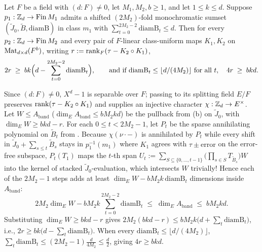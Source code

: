 \begin{theorem}\label{thm:sumset-rank}
Let $F$ be a field with $(d : F) \ne 0$, let $M_1, M_2, b \ge 1$, and let $1 \le k \le d$. Suppose
$p_1 : \mathbb{Z}_d \to \mathrm{Fin}\,M_1$ admits a shifted $(2M_2)$-fold monochromatic sumset
$(\widetilde{J}_0, \widetilde{B}, \mathrm{diamB})$ in class $m_1$ with
$\sum_{t=0}^{2M_2 - 2} \mathrm{diamB}_t \le d$. Then for every $p_2 : \mathbb{Z}_d \to \mathrm{Fin}\,M_2$
and every pair of $F$-linear class-uniform maps $K_1, K_2$ on $\operatorname{Mat}_{d\times d}(F^b)$, writing
$r := \operatorname{rank}_F(\tau - K_2 \circ K_1)$,
\[
  2r \;\ge\; b k \Bigl(d - \sum_{t=0}^{2M_2 - 2} \mathrm{diamB}_t\Bigr),
  \qquad\text{and if } \mathrm{diamB}_t \le \lfloor d/(4M_2)\rfloor \text{ for all } t,\quad
  4r \;\ge\; b k d.
\]
\end{theorem}
\begin{outline}
Since $(d : F) \ne 0$, $X^d - 1$ is separable over $F$; passing to its splitting field $E/F$
preserves $\operatorname{rank}(\tau - K_2 \circ K_1)$ and supplies an injective character $\chi : \mathbb{Z}_d \to E^\times$.
Let $W \le A_{\mathrm{band}}$ ($\dim_E A_{\mathrm{band}} \le b M_2 k d$) be the pullback from
(b) on $\widetilde{J}_0$, with $\dim_E W \ge b k d - r$. For each
$0 \le t < 2M_2 - 1$, let $P_t$ be the sparse annihilating polynomial on $\widetilde{B}_t$ from
. Because $\chi(\nu \cdot -)$ is annihilated by $P_t$ while every shift in
$\widetilde{J}_0 + \sum_{s \le t} \widetilde{B}_s$ stays in $p_1^{-1}(m_1)$ where $K_1$ agrees with
$\tau \pm \text{error}$ on the error-free subspace, $P_t(T_1)$ maps the $t$-th span $U_t :=
\sum_{S \subseteq \{0,\dots,t-1\}} \bigl(\prod_{s\in S} T_{\widetilde{B}_s}\bigr) W$ into the kernel
of stacked $\widetilde{J}_0$-evaluation, which intersects $W$ trivially! Hence each of the
$2M_2 - 1$ steps adds at least $\dim_E W - b M_2 k\,\mathrm{diamB}_t$ dimensions inside
$A_{\mathrm{band}}$:
\[
  2M_2 \dim_E W - b M_2 k \sum_{t=0}^{2M_2 - 2} \mathrm{diamB}_t \;\le\; \dim_E A_{\mathrm{band}}
  \;\le\; b M_2 k d.
\]
Substituting $\dim_E W \ge b k d - r$ gives
$2 M_2(b k d - r) \le b M_2 k\bigl(d + \sum_t \mathrm{diamB}_t\bigr)$, i.e.,
$2r \ge bk\bigl(d - \sum_t \mathrm{diamB}_t\bigr)$. When every $\mathrm{diamB}_t \le \lfloor d/(4M_2)\rfloor$,
$\sum_t \mathrm{diamB}_t \le (2M_2 - 1)\frac{d}{4M_2} \le \frac{d}{2}$, giving $4r \ge b k d$.
\end{outline}

